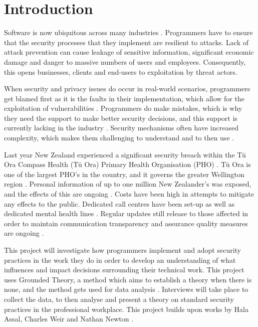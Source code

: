 \chapter{Introduction}\label{C:intro}

\par Software is now ubiquitous across many industries \cite{ubiq}. Programmers have to ensure that the security processes that they implement are resilient to attacks. Lack of attack prevention can cause leakage of sensitive information, significant economic damage and danger to massive numbers of users and employees. Consequently, this opens businesses, clients and end-users to exploitation by threat actors. 
\newline
\par When security and privacy issues do occur in real-world scenarios, programmers get blamed first as it is the faults in their implementation, which allow for the exploitation of vulnerabilities \cite{4}. Programmers do make mistakes, which is why they need the support to make better security decisions, and this support is currently lacking in the industry \cite{4}. Security mechanisms often have increased complexity, which makes them challenging to understand and to then use \cite{6}. 
\newline
\par
Last year New Zealand experienced a significant security breach within the Tū Ora Compass Health (Tū Ora) Primary Health Organisation (PHO) \cite{incident}. Tū Ora is one of the largest PHO's in the country, and it governs the greater Wellington region \cite{incident}. Personal information of up to one million New Zealander's was exposed, and the effects of this are ongoing \cite{incident}. Costs have been high in attempts to mitigate any effects to the public. Dedicated call centres have been set-up as well as dedicated mental health lines \cite{incident,healthpol}. Regular updates still release to those affected in order to maintain communication transparency and assurance quality measures are ongoing \cite{incident,healthpol}. 
\newline
\par This project will investigate how programmers implement and adopt security practices in the work they do in order to develop an understanding of what influences and impact decisions surrounding their technical work. This project uses Grounded Theory, a method which aims to establish a theory when there is none, and the method gets used for data analysis \cite{2}. Interviews will take place to collect the data, to then analyse and present a theory on standard security practices in the professional workplace. This project builds upon works by Hala Assal, Charles Weir and Nathan Newton \cite{summary1, 1, nathan}. 
